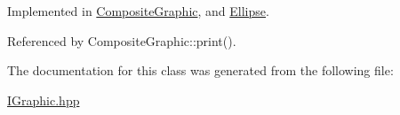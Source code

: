 Implemented in \hyperlink{classCompositeGraphic_a0aa29ff6471a74e221c7acf2b2a4cdd4}{Composite\-Graphic}, and \hyperlink{classEllipse_a837d8f29455932adf5c639f58f856333}{Ellipse}.



Referenced by Composite\-Graphic\-::print().



The documentation for this class was generated from the following file\-:\begin{DoxyCompactItemize}
\item 
\hyperlink{IGraphic_8hpp}{I\-Graphic.\-hpp}\end{DoxyCompactItemize}
